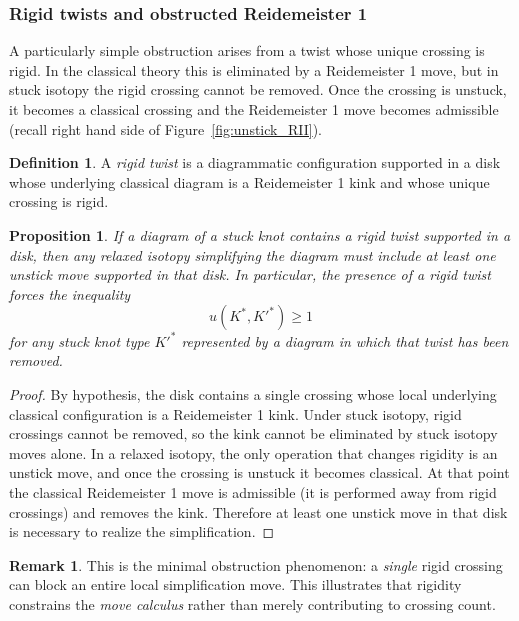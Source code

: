 \documentclass[11pt,a4paper]{article}
\theoremstyle{plain}
\newtheorem{proposition}[theorem]{Proposition}
\theoremstyle{definition}
\newtheorem{definition}[theorem]{Definition}
\newtheorem{remark}[theorem]{Remark}
\begin{document}

\subsubsection*{Rigid twists and obstructed Reidemeister 1}

A particularly simple obstruction arises from a twist whose unique crossing is rigid. In the classical theory this is eliminated by a Reidemeister 1 move, but in stuck isotopy the rigid crossing cannot be
removed. Once the crossing is unstuck, it becomes a classical crossing and the Reidemeister 1 move becomes admissible (recall right hand side of Figure~\ref{fig:unstick_RII}).

\begin{definition}
A \emph{rigid twist} is a diagrammatic configuration supported in a disk whose underlying classical diagram is a Reidemeister 1 kink and whose unique crossing is rigid.
\end{definition}


\begin{proposition}
If a diagram of a stuck knot contains a rigid twist supported in a disk, then any relaxed isotopy simplifying the diagram must include at least one unstick move supported in that disk. In particular, the presence of a rigid twist forces the inequality
\[
u(K^*,K'^*) \ge 1
\]
for any stuck knot type $K'^*$ represented by a diagram in which that twist has been removed.
\end{proposition}

\begin{proof}
By hypothesis, the disk contains a single crossing whose local underlying classical configuration is a Reidemeister 1 kink. Under stuck isotopy, rigid crossings cannot be removed, so the kink cannot be eliminated by stuck isotopy moves alone. In a relaxed isotopy, the only operation that changes rigidity is an unstick move, and once the crossing is unstuck it becomes classical. At that point the classical Reidemeister 1 move is admissible (it is performed away from rigid crossings) and removes the kink. Therefore at least one unstick move in that disk is necessary to realize the simplification.
\end{proof}

\begin{remark}
This is the minimal obstruction phenomenon: a \emph{single} rigid crossing can block an entire local simplification move. This illustrates that rigidity constrains the \emph{move calculus} rather than merely
contributing to crossing count.
\end{remark}
\end{document}
